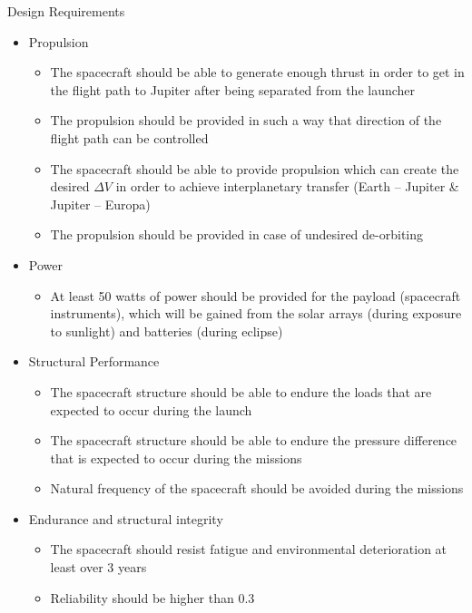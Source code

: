 Design Requirements
\begin{itemize}

\item{Propulsion}
  \begin{itemize}
  \item{The spacecraft should be able to generate enough thrust in
    order to get in the flight path to Jupiter after being separated
    from the launcher}
  \item{The propulsion should be provided in such a way that direction
    of the flight path can be controlled}
  \item{The spacecraft should be able to provide propulsion which can
    create the desired $\Delta V$ in order to achieve interplanetary
    transfer (Earth -- Jupiter \& Jupiter -- Europa)}
  \item{The propulsion should be provided in case of undesired
    de-orbiting}
  \end{itemize}

\item{Power}
  \begin{itemize}
  \item{At least 50 watts of power should be provided for the payload
    (spacecraft instruments), which will be gained from the solar
    arrays (during exposure to sunlight) and batteries (during
    eclipse)}
  \end{itemize}

\item{Structural Performance}
  \begin{itemize}
  \item{The spacecraft structure should be able to endure the loads
    that are expected to occur during the launch}
  \item{The spacecraft structure should be able to endure the pressure
    difference that is expected to occur during the missions}
  \item{Natural frequency of the spacecraft should be avoided during
    the missions}
  \end{itemize}

\item{Endurance and structural integrity}
  \begin{itemize}
  \item{The spacecraft should resist fatigue and environmental
    deterioration at least over 3 years}
  \item{Reliability should be higher than 0.3}
  \end{itemize}


\end{itemize}
